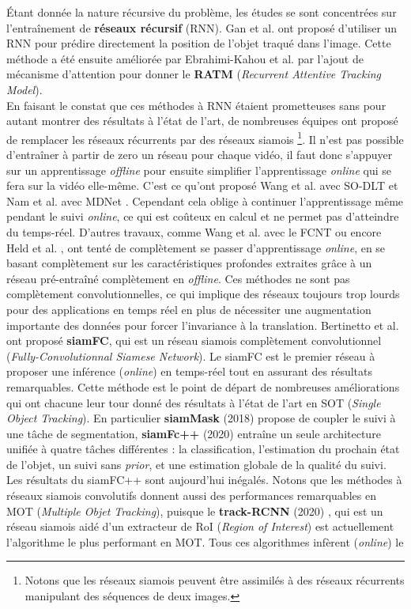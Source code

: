 \documentclass[10pt,twocolumn,letterpaper,french]{article}
\begin{document}
Étant donnée la nature récursive du problème, les études se sont concentrées sur l’entraînement de \textbf{réseaux récursif} (RNN). Gan et al. \cite{RNNtracking} ont proposé d'utiliser un RNN pour prédire directement la position de l'objet traqué dans l'image. Cette méthode a été ensuite améliorée par Ebrahimi-Kahou et al. \cite{RATM} par l'ajout de mécanisme d'attention pour donner le \textbf{RATM} (\textit{Recurrent Attentive Tracking Model}).\\
  

En faisant le constat que ces méthodes à RNN étaient prometteuses sans pour autant montrer des résultats à l'état de l'art, de nombreuses équipes ont proposé de remplacer les réseaux récurrents par des réseaux siamois \footnote{Notons que les réseaux siamois peuvent être assimilés à des réseaux récurrents manipulant des séquences de deux images.}. Il n'est pas possible d’entraîner à partir de zero un réseau pour chaque vidéo, il faut donc s'appuyer sur un apprentissage \textit{offline} pour ensuite simplifier l'apprentissage \textit{online} qui se fera sur la vidéo elle-même. C'est ce qu'ont proposé Wang et al. avec SO-DLT \cite{wang2015transferring} et Nam et al. avec MDNet \cite{nam2016learning}. Cependant cela oblige à continuer l'apprentissage même pendant le suivi \textit{online}, ce qui est coûteux en calcul et ne permet pas d'atteindre du temps-réel. D'autres travaux, comme Wang et al. avec le FCNT \cite{Wang} ou encore Held et al. \cite{held2016learning}, ont tenté de complètement se passer d'apprentissage \textit{online}, en se basant complètement sur les caractéristiques profondes extraites grâce à un réseau pré-entraîné complètement en \textit{offline}. Ces méthodes ne sont pas complètement convolutionnelles, ce qui implique des réseaux toujours trop lourds pour des applications en temps réel en plus de nécessiter une augmentation importante des données pour forcer l'invariance à la translation. Bertinetto et al. \cite{siamfc} ont proposé \textbf{siamFC}, qui est un réseau siamois complètement convolutionnel (\textit{Fully-Convolutionnal Siamese Network}). Le siamFC est le premier réseau à proposer une inférence (\textit{online}) en temps-réel tout en assurant des résultats remarquables. Cette méthode est le point de départ de nombreuses améliorations qui ont chacune leur tour donné des résultats à l'état de l'art en SOT (\textit{Single Object Tracking}). En particulier  \textbf{siamMask} (2018) \cite{siamMask}  propose de coupler le suivi à une tâche de segmentation, \textbf{siamFc++} (2020) \cite{siamfcplusplus}  entraîne un seule architecture unifiée à quatre tâches différentes : la classification, l'estimation du prochain état de l'objet, un suivi sans \textit{prior}, et une estimation globale de la qualité du suivi. Les résultats du siamFC++ sont aujourd'hui inégalés. Notons que les méthodes à réseaux siamois convolutifs donnent aussi des performances remarquables en MOT (\textit{Multiple Objet Tracking}), puisque le \textbf{track-RCNN} (2020)  \cite{trackRCNN}, qui est un réseau siamois aidé d'un extracteur de RoI (\textit{Region of Interest}) est actuellement l'algorithme le plus performant en MOT. Tous ces algorithmes infèrent (\textit{online}) le 
\end{document}
